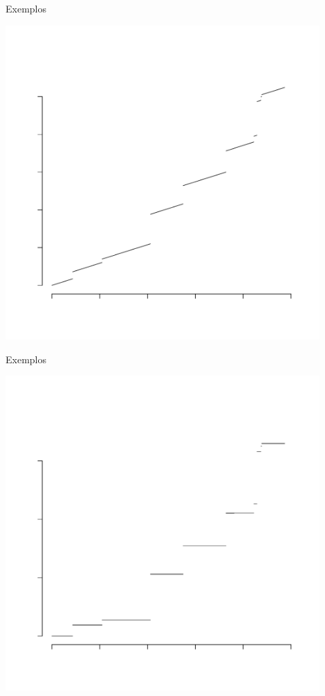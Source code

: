 \documentclass[xcolor=pdftex,dvipsnames]{beamer}
\begin{document}
\begin{frame}{Exemplos}
  \begin{center}
    \includegraphics[width=0.9\textwidth,trim=0cm 4.5cm 0cm 4.5cm]{gamma_c1}
  \end{center}
\end{frame}

\begin{frame}{Exemplos}
  \begin{center}
    \includegraphics[width=0.9\textwidth,trim=0cm 4.5cm 0cm 4.5cm]{gamma_c0}
  \end{center}
\end{frame}
  
\end{document}
